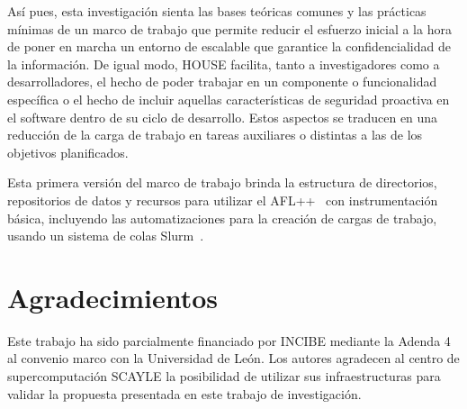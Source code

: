 \documentclass[10pt,conference,a4paper]{IEEEtran}
\begin{document}

Así pues, esta investigación sienta las bases teóricas comunes y las prácticas mínimas de un marco de trabajo que permite reducir el esfuerzo inicial a la hora de poner en marcha un entorno de {\fz} escalable que garantice la confidencialidad de la información. De igual modo, HOUSE facilita, tanto a investigadores como a desarrolladores, el hecho de poder trabajar en un componente o funcionalidad específica o el hecho de incluir aquellas características de seguridad proactiva en el software dentro de su ciclo de desarrollo. Estos aspectos se traducen en una reducción de la carga de trabajo en tareas auxiliares o distintas a las de los objetivos planificados.

Esta primera versión del marco de trabajo brinda la estructura de directorios, repositorios de datos y recursos para utilizar el AFL++~\cite{fuzz_tool_afl++} con instrumentación básica, incluyendo las automatizaciones para la creación de cargas de trabajo, usando un sistema de colas Slurm~\cite{HPC_tool_slurm}. 



\section*{Agradecimientos}


Este trabajo ha sido parcialmente financiado por INCIBE mediante la Adenda 4 al convenio marco con la Universidad de León. Los autores agradecen al centro de supercomputación SCAYLE la posibilidad de utilizar sus infraestructuras para validar la propuesta presentada en este trabajo de investigación.




\end{document}
